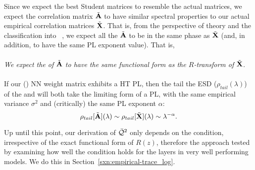 
Since we expect the best Student matrices to resemble the actual \Teacher matrices, we expect the \Student correlation matrix $\tilde{\mathbf{A}}$ to have similar spectral properties to our actual empirical correlation matrices $\tilde{\mathbf{X}}$.
That is, from the perspective of \HTSR theory and the classification into \PhasesOfTraining~\cite{MM18_TR_JMLRversion}, we expect all the $\tilde{\mathbf{A}}$ to be in the same phase as $\tilde{\mathbf{X}}$ (and, in addition, to have the same PL exponent value).   That is, 
\\
\\
\emph{We expect the \RTransform of $\tilde{\mathbf{A}}$ to have the same functional form as the $R$-transform of $\tilde{\mathbf{X}}$.}
\\
\\
If our (\Teacher) NN weight matrix exhibits a HT PL, then the tail the ESD ($\rho_{tail}(\lambda)$) of the \Student and \Teacher will both take the limiting form of a PL, with the same empirical variance $\sigma^{2}$ and (critically) the same PL exponent $\alpha$:
\begin{equation}
\label{eqn:R_PL}
  \rho_{tail}[\tilde{\mathbf{A}}](\lambda)\sim\rho_{tail}[\tilde{\mathbf{X}}](\lambda)\sim\lambda^{-\alpha}.
\end{equation}

Up until this point, our derivation of $\bar{\mathcal{Q}}^{2}$ only depends on the \TRACELOG condition, irrespective of the exact functional form of $R(z)$,
therefore the \SETOL approach tested by examining how well the \TRACELOG condition holds for the layers in very well performing models.
We do this in Section~\ref{sxn:empirical-trace_log}.





